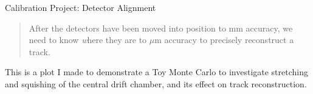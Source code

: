 \begin{slide*}
\slideframe{}
\begin{minipage}[t]{\linewidth}
\Large \black

{\huge Calibration Project: Detector Alignment}

\begin{quote}
  After the detectors have been moved into position to mm accuracy, we
  need to know {\emph where} they are to $\mu$m accuracy to precisely
  reconstruct a track.
\end{quote}

This is a plot I made to demonstrate a Toy Monte Carlo to investigate
stretching and squishing of the central drift chamber, and its effect
on track reconstruction.








\begin{center}
\end{center}

\end{minipage}
\end{slide*}

